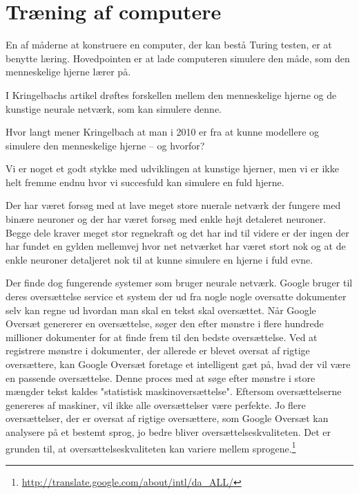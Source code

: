 \section{Træning af computere}

En af måderne at konstruere en computer, der kan bestå Turing testen, er at
benytte læring. Hovedpointen er at lade computeren simulere den måde, som den
menneskelige hjerne lærer på.

I Kringelbachs artikel drøftes forskellen mellem den menneskelige hjerne og
de kunstige neurale netværk, som kan simulere denne.

Hvor langt mener Kringelbach at man i 2010 er fra at kunne modellere og
simulere den menneskelige hjerne – og hvorfor?


Vi er noget et godt stykke med udviklingen at kunstige hjerner, men vi er
ikke helt fremme endnu hvor vi succesfuld kan simulere en fuld hjerne.

Der har været forsøg med at lave meget store nuerale netværk der fungere med
binære neuroner og der har været forsøg med enkle højt detaleret neuroner.
Begge dele kraver meget stor regnekraft og det har ind til videre er der ingen
der har fundet en gylden mellemvej hvor net netværket har været stort nok
og at de enkle neuroner detaljeret nok til at kunne simulere en hjerne i fuld
evne.

Der finde dog fungerende systemer som bruger neurale netværk. Google
bruger til deres oversættelse service et system der ud fra nogle nogle
oversatte dokumenter selv kan regne ud hvordan man skal en tekst skal
oversættet. Når Google Oversæt genererer en oversættelse, søger den
efter mønstre i flere hundrede millioner dokumenter for at finde frem
til den bedste oversættelse. Ved at registrere mønstre i dokumenter,
der allerede er blevet oversat af rigtige oversættere, kan Google
Oversæt foretage et intelligent gæt på, hvad der vil være en passende
oversættelse. Denne proces med at søge efter mønstre i store mængder
tekst kaldes "statistisk maskinoversættelse". Eftersom oversættelserne
genereres af maskiner, vil ikke alle oversættelser være perfekte. Jo flere
oversættelser, der er oversat af rigtige oversættere, som Google Oversæt
kan analysere på et bestemt sprog, jo bedre bliver oversættelseskvaliteten.
Det er grunden til, at oversættelseskvaliteten kan variere mellem
sprogene.\footnote{\url{http://translate.google.com/about/intl/da\_ALL/}}

